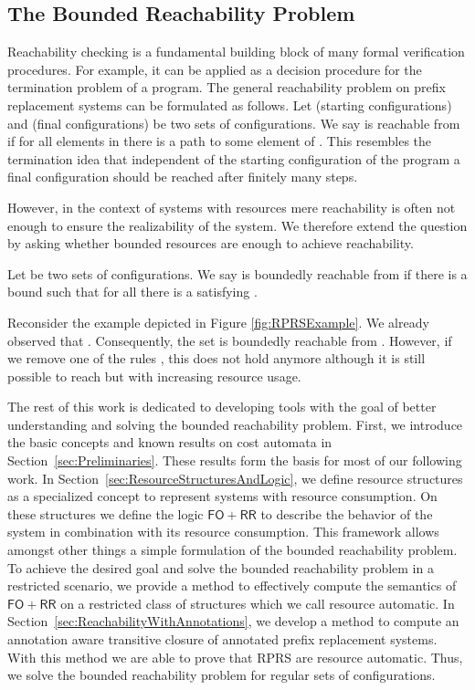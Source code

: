 \documentclass{LMCS}
\newcommand{\FORR}{\ensuremath{\mathsf{FO\!\!+\!\!RR}}}
\newcommand{\RPRS}{\textsf{RPRS}}
\begin{document}
\subsection{The Bounded Reachability Problem}
\label{subsec:BoundedReachability}

Reachability checking is a fundamental building block of many formal
verification procedures. For example, it can be applied as a decision procedure
for the termination problem of a program. The general reachability problem 
on prefix replacement systems can be formulated as follows. Let  (starting 
configurations) and  (final configurations) be two sets of
configurations. We say  is reachable from  if for all elements
in  there is a path to some element of . This resembles the termination
idea that independent of the starting configuration of the program a final
configuration should be reached after finitely many steps.


However, in the context of systems with resources mere reachability is
often not enough to ensure the realizability of the system. 
We therefore extend the question by asking whether bounded
resources are enough to achieve reachability.

\begin{defi}
  Let  be two sets of configurations. We say  is boundedly reachable
  from  if there is a bound  such that for all  there
  is a  satisfying .
\end{defi}

Reconsider the example depicted in Figure \ref{fig:RPRSExample}. We already
observed
that . Consequently, the set  is
boundedly reachable from . However, if we remove one
of the rules  , this does not
hold anymore although it is still possible to reach  but with increasing
resource usage.

The rest of this work is dedicated to developing tools with the goal of better
understanding and solving the bounded reachability problem. First, we
introduce the basic concepts and known results on cost automata in
Section~\ref{sec:Preliminaries}. These results form the basis for most of our
following work. In Section~\ref{sec:ResourceStructuresAndLogic}, we define
resource structures as a specialized concept to represent systems with resource
consumption. On these structures we define the logic \FORR{} to describe
the behavior of the system in combination with its resource consumption. This
framework allows amongst other things a simple formulation of the bounded reachability problem. To
achieve the desired goal and solve the bounded reachability problem in a
restricted scenario, we provide a method to effectively compute the
semantics of \FORR{} on a restricted class of structures which we call resource
automatic. In Section~\ref{sec:ReachabilityWithAnnotations}, we develop a method
to compute an annotation aware transitive closure of annotated prefix
replacement systems. With this method we are able to prove that \RPRS{} are
resource automatic. Thus, we solve the bounded reachability problem for regular
sets of configurations. 
\end{document}
